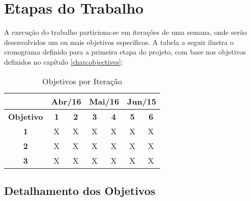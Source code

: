 \chapter{\label{chap:work-plan}Etapas do Trabalho}

A execução do trabalho particiona-se em iterações de uma semana, onde serão
desenvolvidos um ou mais objetivos específicos. A tabela a seguir ilustra o
cronograma definido para a primeira etapa do projeto, com base nos objetivos
definidos no capítulo \ref{chap:objectives}:

\begin{table}[htb!]
\centering
\caption{Objetivos por Iteração}
\label{tab:work-plan}
\begin{tabular}{c|c|c|c|c|c|c|}
\cline{2-7}
{\bf}                                 & \multicolumn{2}{c|}{{\bf Abr/16}}             & \multicolumn{2}{c|}{{\bf Mai/16}}             & \multicolumn{2}{c|}{{\bf Jun/15}} \\ \hline
\multicolumn{1}{|c|}{{\bf Objetivo}}  & {\bf 1}               & {\bf 2}               & {\bf 3}               & {\bf 4}               & {\bf 5}               & {\bf 6}   \\ \hline
\multicolumn{1}{|c|}{{\bf 1}}         & X                     & X                     & X                     & X                     & X                     & X   \\ \hline
\multicolumn{1}{|c|}{{\bf 2}}         & X                     & X                     & X                     & X                     & X                     & X   \\ \hline
\multicolumn{1}{|c|}{{\bf 3}}         & X                     & X                     & X                     & X                     & X                     & X   \\ \hline
\end{tabular}
\end{table}

\section{Detalhamento dos Objetivos}

